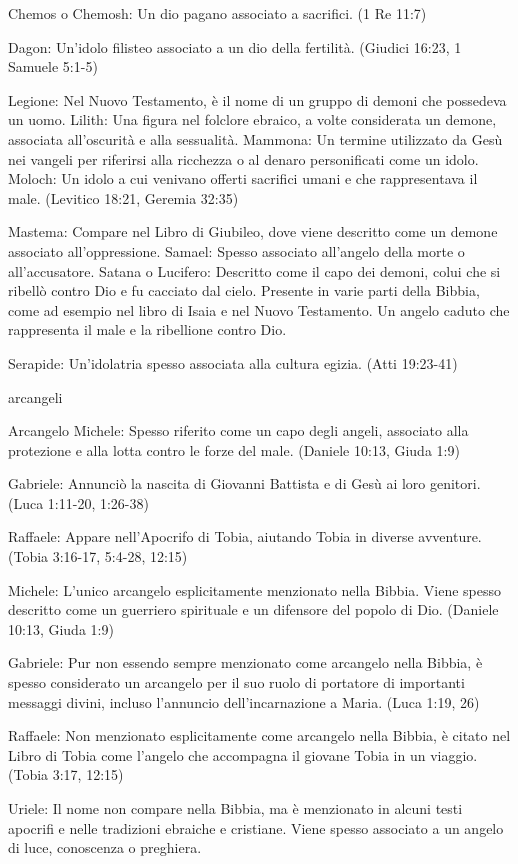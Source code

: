 \documentclass[a4paper,twoside,openany]{book}
\begin{document}
Chemos o Chemosh: Un dio pagano associato a sacrifici. (1 Re 11:7)


Dagon: Un'idolo filisteo associato a un dio della fertilità. (Giudici 16:23, 1 Samuele 5:1-5)


Legione: Nel Nuovo Testamento, è il nome di un gruppo di demoni che possedeva un uomo.
Lilith: Una figura nel folclore ebraico, a volte considerata un demone, associata all'oscurità e alla sessualità.
Mammona: Un termine utilizzato da Gesù nei vangeli per riferirsi alla ricchezza o al denaro personificati come un idolo.
Moloch: Un idolo a cui venivano offerti sacrifici umani e che rappresentava il male. (Levitico 18:21, Geremia 32:35)


Mastema: Compare nel Libro di Giubileo, dove viene descritto come un demone associato all'oppressione.
Samael: Spesso associato all'angelo della morte o all'accusatore.
Satana o Lucifero: Descritto come il capo dei demoni, colui che si ribellò contro Dio e fu cacciato dal cielo. Presente in varie parti della Bibbia, come ad esempio nel libro di Isaia e nel Nuovo Testamento. Un angelo caduto che rappresenta il male e la ribellione contro Dio.

Serapide: Un'idolatria spesso associata alla cultura egizia. (Atti 19:23-41)


arcangeli


Arcangelo Michele: Spesso riferito come un capo degli angeli, associato alla protezione e alla lotta contro le forze del male. (Daniele 10:13, Giuda 1:9)

Gabriele: Annunciò la nascita di Giovanni Battista e di Gesù ai loro genitori. (Luca 1:11-20, 1:26-38)

Raffaele: Appare nell'Apocrifo di Tobia, aiutando Tobia in diverse avventure. (Tobia 3:16-17, 5:4-28, 12:15)


Michele: L'unico arcangelo esplicitamente menzionato nella Bibbia. Viene spesso descritto come un guerriero spirituale e un difensore del popolo di Dio. (Daniele 10:13, Giuda 1:9)

Gabriele: Pur non essendo sempre menzionato come arcangelo nella Bibbia, è spesso considerato un arcangelo per il suo ruolo di portatore di importanti messaggi divini, incluso l'annuncio dell'incarnazione a Maria. (Luca 1:19, 26)

Raffaele: Non menzionato esplicitamente come arcangelo nella Bibbia, è citato nel Libro di Tobia come l'angelo che accompagna il giovane Tobia in un viaggio. (Tobia 3:17, 12:15)

Uriele: Il nome non compare nella Bibbia, ma è menzionato in alcuni testi apocrifi e nelle tradizioni ebraiche e cristiane. Viene spesso associato a un angelo di luce, conoscenza o preghiera.
\end{document}
